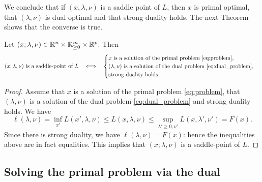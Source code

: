 \documentclass[11pt,nocut]{article}
\begin{document}
We conclude that if $(x,\lambda,\nu)$ is a saddle point of $L$, then $x$ is primal optimal, that $(\lambda,\nu)$ is dual optimal and that strong duality holds. The next Theorem shows that the converse is true.

\begin{theorem}\label{th:saddle}
	Let $(x; \lambda,\nu) \in \mathbb{R}^n \times \mathbb{R}_{\geq 0}^m \times \mathbb{R}^p$. Then
	\vspace{-4mm}
	$$
	(x;\lambda,\nu) \ \text{is a saddle-point of} \ L
	\quad \Longleftrightarrow \quad
	\begin{cases}
x \ \text{is a solution of the primal problem} \ \eqref{eq:problem}, \\
(\lambda,\nu) \ \text{is a solution of the dual problem} \ \eqref{eq:dual_problem}, \\
	\text{strong duality holds.}
	\end{cases}
	$$
	\vspace{-3mm}
\end{theorem}
\begin{proof}
Assume that $x$ is a solution of the primal problem \eqref{eq:problem}, that $(\lambda,\nu)$ is a solution of the dual problem \eqref{eq:dual_problem} and strong duality holds.
We have
$$
\ell(\lambda,\nu) = \inf_{x'} L(x',\lambda,\nu) \leq
L(x,\lambda,\nu) \leq \sup_{\lambda' \geq 0, \nu'} L(x,\lambda',\nu') = F(x).
$$
Since there is strong duality, we have $\ell(\lambda,\nu) = F(x)$: hence the inequalities above are in fact equalities. This implies that $(x;\lambda,\nu)$ is a saddle-point of $L$.
\end{proof}

\subsection{Solving the primal problem via the dual}
\end{document}
